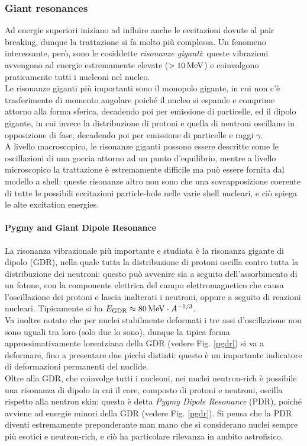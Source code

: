 \subsubsection{Giant resonances}
\label{sub-giant-res}

Ad energie superiori iniziano ad influire anche le eccitazioni dovute al pair breaking, dunque la trattazione si fa molto più complessa. Un fenomeno interessante, però, sono le cosiddette \textit{risonanze giganti}: queste vibrazioni avvengono ad energie estremamente elevate ($ > 10\,\mathrm{MeV} $) e coinvolgono praticamente tutti i nucleoni nel nucleo.\\
Le risonanze giganti più importanti sono il monopolo gigante, in cui non c'è trasferimento di momento angolare poiché il nucleo si espande e comprime attorno alla forma sferica, decadendo poi per emissione di particelle, ed il dipolo gigante, in cui invece la distribuzione di protoni e quella di neutroni oscillano in opposizione di fase, decadendo poi per emissione di particelle e raggi $ \gamma $.\\
A livello macroscopico, le risonanze giganti possono essere descritte come le oscillazioni di una goccia attorno ad un punto d'equilibrio, mentre a livello microscopico la trattazione è estremamente difficile ma può essere fornita dal modello a shell: queste risonanze altro non sono che una sovrapposizione coerente di tutte le possibili eccitazioni particle-hole nelle varie shell nucleari, e ciò spiega le alte excitation energies.

\paragraph{Pygmy and Giant Dipole Resonance}

La risonanza vibrazionale più importante e studiata è la risonanza gigante di dipolo (GDR), nella quale tutta la distribuzione di protoni oscilla contro tutta la distribuzione dei neutroni: questo può avvenire sia a seguito dell'assorbimento di un fotone, con la componente elettrica del campo elettromagnetico che causa l'oscillazione dei protoni e lascia inalterati i neutroni, oppure a seguito di reazioni nucleari. Tipicamente si ha $ E_{\text{GDR}} \approx 80\,\mathrm{MeV} \cdot A^{-1/3} $.\\
Va inoltre notato che per nuclei stabilmente deformati i tre assi d'oscillazione non sono uguali tra loro (solo due lo sono), dunque la tipica forma approssimativamente lorentziana della GDR (vedere Fig. \ref{pgdr}) si va a deformare, fino a presentare due picchi distinti: questo è un importante indicatore di deformazioni permanenti del nuclide.\\
Oltre alla GDR, che coinvolge tutti i nucleoni, nei nuclei neutron-rich è possibile una risonanza di dipolo in cui il core, composto di protoni e neutroni, oscilla rispetto alla neutron skin: questa è detta \textit{Pygmy Dipole Resonance} (PDR), poiché avviene ad energie minori della GDR (vedere Fig. \ref{pgdr}). Si pensa che la PDR diventi estremamente preponderante man mano che si considerano nuclei sempre più esotici e neutron-rich, e ciò ha particolare rilevanza in ambito astrofisico.

